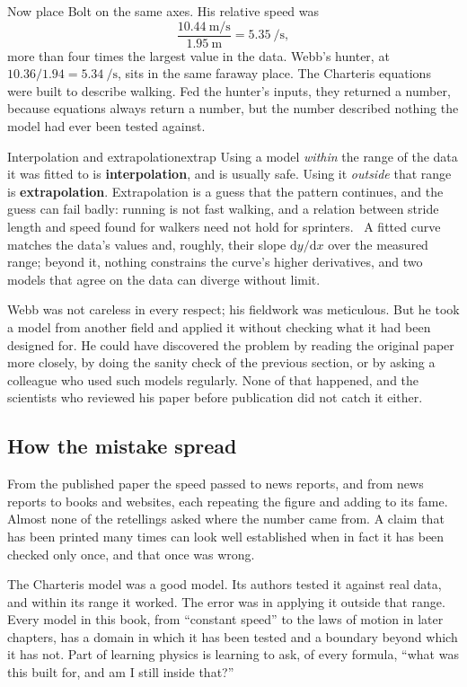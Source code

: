 \documentclass[11pt,twoside,openany]{book}
\newcommand{\dd}{\mathrm{d}}
\newcounter{check}[chapter]
\newcommand{\viewtag}[3]{\fcolorbox{#2}{#3}{\footnotesize\textbf{\textcolor{#2}{#1}}}}
\newcommand{\calctag}{\viewtag{Calculus}{calccol}{calcpale}}
\begin{document}
Now place Bolt on the same axes. His relative speed was
\[
\frac{\SI{10.44}{\metre\per\second}}{\SI{1.95}{\metre}} = \SI{5.35}{\per\second},
\]
more than four times the largest value in the data. Webb's hunter, at $10.36/1.94 = \SI{5.34}{\per\second}$, sits in the same faraway place. The Charteris equations were built to describe walking. Fed the hunter's inputs, they returned a number, because equations always return a number, but the number described nothing the model had ever been tested against.

\begin{definition}{Interpolation and extrapolation}{extrap}
Using a model \emph{within} the range of the data it was fitted to is \textbf{interpolation}, and is usually safe. Using it \emph{outside} that range is \textbf{extrapolation}. Extrapolation is a guess that the pattern continues, and the guess can fail badly: running is not fast walking, and a relation between stride length and speed found for walkers need not hold for sprinters. \calctag\ A fitted curve matches the data's values and, roughly, their slope $\dd y/\dd x$ over the measured range; beyond it, nothing constrains the curve's higher derivatives, and two models that agree on the data can diverge without limit.
\end{definition}

Webb was not careless in every respect; his fieldwork was meticulous. But he took a model from another field and applied it without checking what it had been designed for. He could have discovered the problem by reading the original paper more closely, by doing the sanity check of the previous section, or by asking a colleague who used such models regularly. None of that happened, and the scientists who reviewed his paper before publication did not catch it either.

\subsection{How the mistake spread}

From the published paper the speed passed to news reports, and from news reports to books and websites, each repeating the figure and adding to its fame. Almost none of the retellings asked where the number came from. A claim that has been printed many times can look well established when in fact it has been checked only once, and that once was wrong.

\begin{modelnote}
The Charteris model was a good model. Its authors tested it against real data, and within its range it worked. The error was in applying it outside that range. Every model in this book, from ``constant speed'' to the laws of motion in later chapters, has a domain in which it has been tested and a boundary beyond which it has not. Part of learning physics is learning to ask, of every formula, ``what was this built for, and am I still inside that?''
\end{modelnote}
\end{document}
